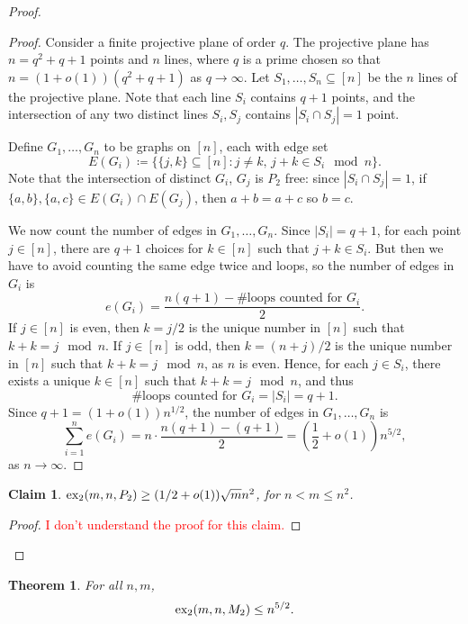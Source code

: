\documentclass[12pt]{report}
\newtheorem{theorem}{Theorem}[chapter]
\newtheorem{claim}{Claim}[theorem]
\newcommand*{\dex}{\textnormal{ex}_2}
\begin{document}
\begin{proof}
\begin{proof}
    Consider a finite projective plane of order $q$. The projective plane has $n = q^2 + q + 1$ points and $n$ lines, where $q$ is a prime chosen so that $n = (1 + o(1))(q^2 + q + 1)$ as $q \to \infty$. Let $S_1, \ldots, S_n \subseteq [n]$ be the $n$ lines of the projective plane. Note that each line $S_i$ contains $q + 1$ points, and the intersection of any two distinct lines $S_i, S_j$ contains $|S_i \cap S_j| = 1$ point. 
    
    Define $G_1, \ldots, G_n$ to be graphs on $[n]$, each with edge set
    \[
      E(G_i) \coloneq \{\{j, k\} \subseteq [n] : j \neq k, \, j + k \in S_i \mod n\}.
    \]
    Note that the intersection of distinct $G_i$, $G_j$ is $P_2$ free: since $|S_i \cap S_j| = 1$, if $\{a, b\}, \{a, c\} \in E(G_i) \cap E(G_j)$, then $a + b = a + c$ so $b = c$. 
    
    We now count the number of edges in $G_1, \ldots, G_n$. Since $|S_i| = q + 1$, for each point $j \in [n]$, there are $q + 1$ choices for $k \in [n]$ such that $j + k \in S_i$. But then we have to avoid counting the same edge twice and loops, so the number of edges in $G_i$ is
    \[
      e(G_i) = \frac{n(q + 1) - \#\text{loops counted for } G_i}{2}.
    \]
    If $j \in [n]$ is even, then $k = j/2$ is the unique number in $[n]$ such that $k + k = j \mod n$. If $j \in [n]$ is odd, then $k = (n + j)/2$ is the unique number in $[n]$ such that $k + k = j \mod n$, as $n$ is even. Hence, for each $j \in S_i$, there exists a unique $k \in [n]$ such that $k + k = j \mod n$, and thus
    \[
      \#\text{loops counted for } G_i = |S_i| = q + 1.
    \]
    Since $q + 1 = (1 + o(1))n^{1/2}$, the number of edges in $G_1, \ldots, G_n$ is
    \[
      \sum_{i = 1}^n e(G_i) = n \cdot \frac{n(q + 1) - (q + 1)}{2} = \left(\frac{1}{2} + o(1)\right)n^{5/2},
    \]
    as $n \to \infty$.
  \end{proof}
  \begin{claim}
    $\dex(m, n, P_2) \geq (1/2 + o(1))\sqrt{m}n^{2}$, for $n < m \leq n^2$.
  \end{claim}
  \begin{proof}
    \textcolor{red}{I don't understand the proof for this claim.}
  \end{proof}
\end{proof}

\begin{theorem}
  For all $n, m$,
  \[
    \dex(m, n, M_2) \leq n^{5/2}.
  \]
\end{theorem}
\end{document}
